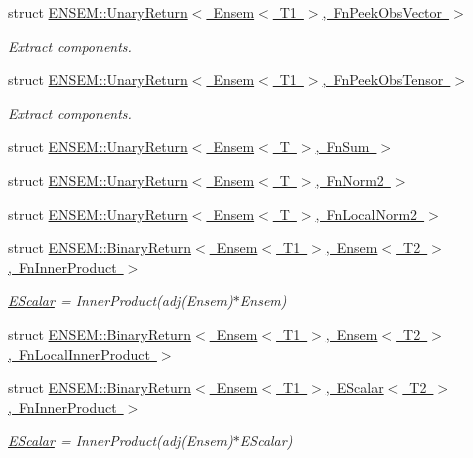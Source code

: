 \begin{DoxyCompactItemize}
struct \mbox{\hyperlink{structENSEM_1_1UnaryReturn_3_01Ensem_3_01T1_01_4_00_01FnPeekObsVector_01_4}{E\+N\+S\+E\+M\+::\+Unary\+Return$<$ Ensem$<$ T1 $>$, Fn\+Peek\+Obs\+Vector $>$}}
\begin{DoxyCompactList}\small\item\em Extract components. \end{DoxyCompactList}\item 
struct \mbox{\hyperlink{structENSEM_1_1UnaryReturn_3_01Ensem_3_01T1_01_4_00_01FnPeekObsTensor_01_4}{E\+N\+S\+E\+M\+::\+Unary\+Return$<$ Ensem$<$ T1 $>$, Fn\+Peek\+Obs\+Tensor $>$}}
\begin{DoxyCompactList}\small\item\em Extract components. \end{DoxyCompactList}\item 
struct \mbox{\hyperlink{structENSEM_1_1UnaryReturn_3_01Ensem_3_01T_01_4_00_01FnSum_01_4}{E\+N\+S\+E\+M\+::\+Unary\+Return$<$ Ensem$<$ T $>$, Fn\+Sum $>$}}
\item 
struct \mbox{\hyperlink{structENSEM_1_1UnaryReturn_3_01Ensem_3_01T_01_4_00_01FnNorm2_01_4}{E\+N\+S\+E\+M\+::\+Unary\+Return$<$ Ensem$<$ T $>$, Fn\+Norm2 $>$}}
\item 
struct \mbox{\hyperlink{structENSEM_1_1UnaryReturn_3_01Ensem_3_01T_01_4_00_01FnLocalNorm2_01_4}{E\+N\+S\+E\+M\+::\+Unary\+Return$<$ Ensem$<$ T $>$, Fn\+Local\+Norm2 $>$}}
\item 
struct \mbox{\hyperlink{structENSEM_1_1BinaryReturn_3_01Ensem_3_01T1_01_4_00_01Ensem_3_01T2_01_4_00_01FnInnerProduct_01_4}{E\+N\+S\+E\+M\+::\+Binary\+Return$<$ Ensem$<$ T1 $>$, Ensem$<$ T2 $>$, Fn\+Inner\+Product $>$}}
\begin{DoxyCompactList}\small\item\em \mbox{\hyperlink{classENSEM_1_1EScalar}{E\+Scalar}} = Inner\+Product(adj(\+Ensem)$\ast$\+Ensem) \end{DoxyCompactList}\item 
struct \mbox{\hyperlink{structENSEM_1_1BinaryReturn_3_01Ensem_3_01T1_01_4_00_01Ensem_3_01T2_01_4_00_01FnLocalInnerProduct_01_4}{E\+N\+S\+E\+M\+::\+Binary\+Return$<$ Ensem$<$ T1 $>$, Ensem$<$ T2 $>$, Fn\+Local\+Inner\+Product $>$}}
\item 
struct \mbox{\hyperlink{structENSEM_1_1BinaryReturn_3_01Ensem_3_01T1_01_4_00_01EScalar_3_01T2_01_4_00_01FnInnerProduct_01_4}{E\+N\+S\+E\+M\+::\+Binary\+Return$<$ Ensem$<$ T1 $>$, E\+Scalar$<$ T2 $>$, Fn\+Inner\+Product $>$}}
\begin{DoxyCompactList}\small\item\em \mbox{\hyperlink{classENSEM_1_1EScalar}{E\+Scalar}} = Inner\+Product(adj(\+Ensem)$\ast$\+E\+Scalar) \end{DoxyCompactList}\item 

\end{DoxyCompactItemize}
